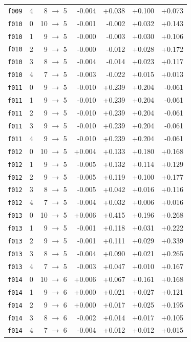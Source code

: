\documentclass[11pt]{article}
\begin{document}
\begin{table}[htbp]
\begin{tabular}{llrrrrr}
\texttt{f009} & 4 & 8 $\to$ 5 & -0.004 & +0.038 & +0.100 & +0.073 \\
\texttt{f010} & 0 & 10 $\to$ 5 & -0.001 & -0.002 & +0.032 & +0.143 \\
\texttt{f010} & 1 & 9 $\to$ 5 & -0.000 & -0.003 & +0.030 & +0.106 \\
\texttt{f010} & 2 & 9 $\to$ 5 & -0.000 & -0.012 & +0.028 & +0.172 \\
\texttt{f010} & 3 & 8 $\to$ 5 & -0.004 & -0.014 & +0.023 & +0.117 \\
\texttt{f010} & 4 & 7 $\to$ 5 & -0.003 & -0.022 & +0.015 & +0.013 \\
\texttt{f011} & 0 & 9 $\to$ 5 & -0.010 & +0.239 & +0.204 & -0.061 \\
\texttt{f011} & 1 & 9 $\to$ 5 & -0.010 & +0.239 & +0.204 & -0.061 \\
\texttt{f011} & 2 & 9 $\to$ 5 & -0.010 & +0.239 & +0.204 & -0.061 \\
\texttt{f011} & 3 & 9 $\to$ 5 & -0.010 & +0.239 & +0.204 & -0.061 \\
\texttt{f011} & 4 & 9 $\to$ 5 & -0.010 & +0.239 & +0.204 & -0.061 \\
\texttt{f012} & 0 & 10 $\to$ 5 & +0.004 & +0.133 & +0.180 & +0.168 \\
\texttt{f012} & 1 & 9 $\to$ 5 & -0.005 & +0.132 & +0.114 & +0.129 \\
\texttt{f012} & 2 & 9 $\to$ 5 & -0.005 & +0.119 & +0.100 & +0.177 \\
\texttt{f012} & 3 & 8 $\to$ 5 & -0.005 & +0.042 & +0.016 & +0.116 \\
\texttt{f012} & 4 & 7 $\to$ 5 & -0.004 & +0.032 & +0.006 & +0.016 \\
\texttt{f013} & 0 & 10 $\to$ 5 & +0.006 & +0.415 & +0.196 & +0.268 \\
\texttt{f013} & 1 & 9 $\to$ 5 & -0.001 & +0.118 & +0.031 & +0.222 \\
\texttt{f013} & 2 & 9 $\to$ 5 & -0.001 & +0.111 & +0.029 & +0.339 \\
\texttt{f013} & 3 & 8 $\to$ 5 & -0.004 & +0.090 & +0.021 & +0.265 \\
\texttt{f013} & 4 & 7 $\to$ 5 & -0.003 & +0.047 & +0.010 & +0.167 \\
\texttt{f014} & 0 & 10 $\to$ 6 & +0.006 & +0.067 & +0.161 & +0.168 \\
\texttt{f014} & 1 & 9 $\to$ 6 & +0.000 & +0.021 & +0.027 & +0.121 \\
\texttt{f014} & 2 & 9 $\to$ 6 & +0.000 & +0.017 & +0.025 & +0.195 \\
\texttt{f014} & 3 & 8 $\to$ 6 & -0.002 & +0.014 & +0.017 & +0.105 \\
\texttt{f014} & 4 & 7 $\to$ 6 & -0.004 & +0.012 & +0.012 & +0.015 \\
\bottomrule
\end{tabular}
\end{table}
\end{document}
